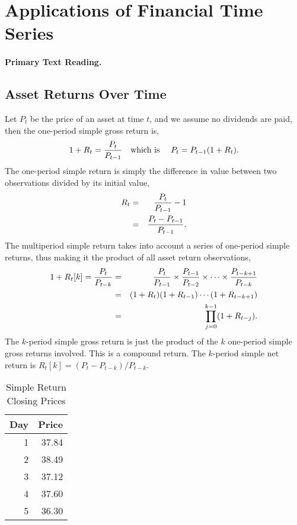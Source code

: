 \section{Applications of Financial Time Series}
\paragraph{Primary Text Reading.} 

\subsection{Asset Returns Over Time}
Let $P_t$ be the price of an asset at time $t$, and we assume no dividends are paid, then the one-period simple gross return is,
\begin{equation}
1 + R_t = \frac{P_t}{P_{t-1}} \text{\quad which is \quad} P_t = P_{t-1}(1 + R_t).
\end{equation}
The one-period simple return is simply the difference in value between two observations divided by its initial value,
\begin{eqnarray}
R_t &=& \frac{P_t}{P_{t-1}} -1 \label{eq:1pd-ret} \\
&=& \frac{P_t - P_{t-1}}{P_{t-1}}. \notag
\end{eqnarray}
The multiperiod simple return takes into account a series of one-period simple returns, thus making it the product of all asset return observations,
\begin{eqnarray}
1+R_t[k] = \frac{P_t}{P_{t-k}} &=& \frac{P_t}{P_{t-1}} \times \frac{P_{t-1}}{P_{t-2}} \times \cdots \times \frac{P_{t-k+1}}{P_{t-k}} \label{eq:multiperiod} \\
&=& (1+R_t)(1+R_{t-1})\cdots(1+R_{t-k+1}) \notag \\
&=& \prod^{k-1}_{j=0}(1+R_{t-j}). \notag
\end{eqnarray}
The $k$-period simple gross return is just the product of the $k$ one-period simple gross returns involved. This is a compound return. The $k$-period simple net return is $R_t[k]=(P_t - P_{t-k})/P_{t-k}$.

\begin{table}[htbp]
   \centering
   \begin{tabular}{rr}
      \toprule
      Day & Price \\
      \hline
      1 & 37.84 \\
      2 & 38.49 \\
      3 & 37.12 \\
      4 & 37.60 \\
      5 & 36.30 \\
      \bottomrule
   \end{tabular}
   \caption{Simple Return Closing Prices}
   \label{tab:simp-rets}
\end{table}

